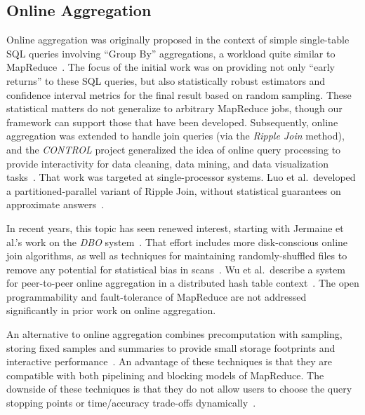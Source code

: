 \subsection{Online Aggregation}
Online aggregation was originally proposed in the context of simple single-table
SQL queries involving ``Group By'' aggregations, a workload quite similar to
MapReduce~\cite{onlineagg}.  The focus of the initial work was on providing not
only ``early returns'' to these SQL queries, but also statistically robust
estimators and confidence interval metrics for the final result based on random
sampling.  These statistical matters do not generalize to arbitrary MapReduce
jobs, though our framework can support those that have been developed.
Subsequently, online aggregation was extended to handle join queries (via the
\emph{Ripple Join} method), and the \emph{CONTROL} project generalized the idea
of online query processing to provide interactivity for data cleaning, data
mining, and data visualization tasks~\cite{ieeecontrol}.  That work was targeted
at single-processor systems.  Luo et al.\ developed a partitioned-parallel
variant of Ripple Join, without statistical guarantees on approximate
answers~\cite{luo-ripple}.

In recent years, this topic has seen renewed interest, starting with Jermaine et
al.'s work on the \emph{DBO} system~\cite{dbo}.  That effort includes more
disk-conscious online join algorithms, as well as techniques for maintaining
randomly-shuffled files to remove any potential for statistical bias in
scans~\cite{jermaine-shuffle}.  Wu et al.\ describe a system for peer-to-peer
online aggregation in a distributed hash table context~\cite{wu-vldb09}.  The
open programmability and fault-tolerance of MapReduce are not addressed
significantly in prior work on online aggregation.

An alternative to online aggregation combines precomputation with sampling,
storing fixed samples and summaries to provide small storage footprints and
interactive performance~\cite{gibbons98new}. An advantage of these techniques is
that they are compatible with both pipelining and blocking models of
MapReduce. The downside of these techniques is that they do not allow users to
choose the query stopping points or time/accuracy trade-offs
dynamically~\cite{ieeecontrol}.

